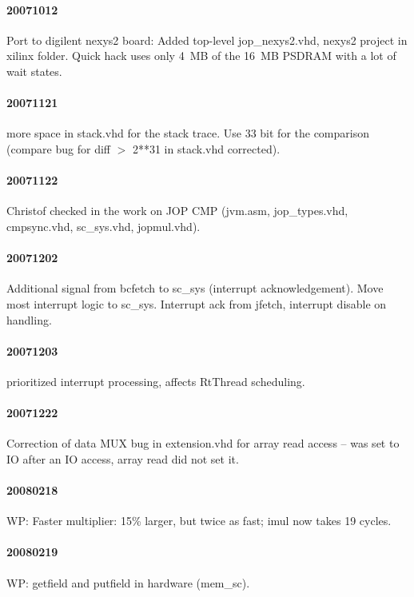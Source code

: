 \documentclass[a4paper,12pt]{scrartcl}
\newcommand{\code}[1]{{\textsf{#1}}}
\begin{document}
\paragraph{20071012} Port to digilent nexys2 board: Added top-level
jop\_nexys2.vhd, nexys2 project in xilinx folder. Quick hack uses
only 4~MB of the 16~MB PSDRAM with a lot of wait states.

\paragraph{20071121} more space in stack.vhd for the stack
trace. Use 33 bit for the comparison (compare bug for diff $>$ 2**31
in stack.vhd corrected).

\paragraph{20071122} Christof checked in the work on JOP CMP
(jvm.asm, jop\_types.vhd, cmpsync.vhd, sc\_sys.vhd,
jopmul.vhd).

\paragraph{20071202} Additional signal from \code{bcfetch} to
\code{sc\_sys} (interrupt acknowledgement). Move most interrupt
logic to \code{sc\_sys}. Interrupt ack from \code{jfetch},
interrupt disable on handling.

\paragraph{20071203} prioritized interrupt processing, affects
RtThread scheduling.

\paragraph{20071222} Correction of data MUX bug in \code{extension.vhd} for array read
access -- was set to IO after an IO access, array read did not set
it.

\paragraph{20080218} WP: Faster multiplier: 15\% larger, but twice as
fast; \code{imul} now takes 19 cycles.

\paragraph{20080219} WP: getfield and putfield in hardware
(\code{mem\_sc}).
\end{document}
